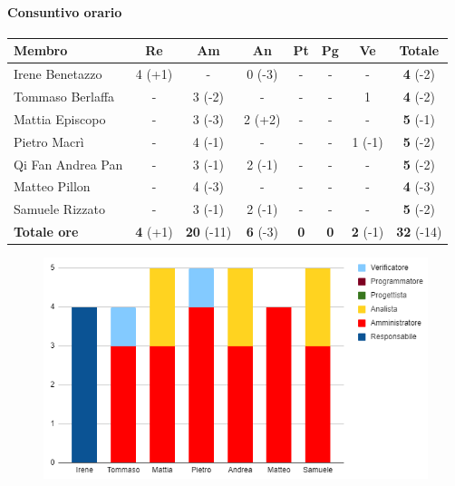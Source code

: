 \paragraph{Consuntivo orario}
\begin{center}
	\renewcommand{\arraystretch}{1.8} %
	\begin{tabular}{ |m{8em}|c|c|c|c|c|c|c| }
	\hline
	\textbf{Membro} & \textbf{Re} & \textbf{Am} &  \textbf{An} &  \textbf{Pt} &  \textbf{Pg} &  \textbf{Ve} &  \textbf{Totale}\\
    \hline
    Irene Benetazzo   & 4 (+1) & -      & 0 (-3) & - & - & -     & \textbf{4} (-2) \\
    \hline
    Tommaso Berlaffa  & -      & 3 (-2) & -      & - & - & 1      & \textbf{4} (-2) \\
    \hline
    Mattia Episcopo   & -      & 3 (-3) & 2 (+2) & - & - & -      & \textbf{5} (-1) \\
    \hline
    Pietro Macrì      & -      & 4 (-1) & -      & - & - & 1 (-1) & \textbf{5} (-2) \\
    \hline
    Qi Fan Andrea Pan & -      & 3 (-1) & 2 (-1) & - & - & -      & \textbf{5} (-2) \\
    \hline
    Matteo Pillon     & -      & 4 (-3) & -      & - & - & -      & \textbf{4} (-3) \\
    \hline
    Samuele Rizzato   & -      & 3 (-1) & 2 (-1) & - & - & -      & \textbf{5} (-2) \\
    \hline
    \textbf{Totale ore} & \textbf{4} (+1) & \textbf{20} (-11) &  \textbf{6} (-3) &  \textbf{0} &  \textbf{0} &  \textbf{2} (-1) &  \textbf{32} (-14)\\
    \hline
	\end{tabular}
\end{center}
\begin{figure}[H]
    \centering\includegraphics{images/consuntivo/RTB-documentale-ore.png}
\end{figure}

